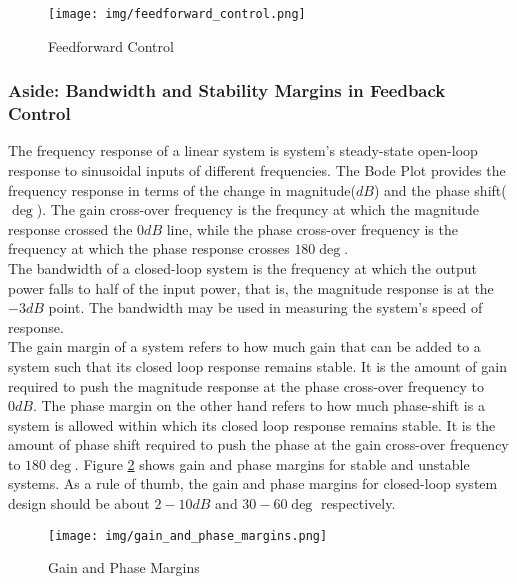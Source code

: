 \documentclass[a4paper]{article}
\begin{document}
\begin{figure}
        \centering
        \texttt{[image: img/feedforward\_control.png]}
        \caption{Feedforward Control \cite{kim17}}
        \label{fig:Cascaded}
\end{figure}


\subsubsection{Aside: Bandwidth and Stability Margins in Feedback Control}

The frequency response of a linear system is system's steady-state open-loop response to sinusoidal inputs of different frequencies. 
The Bode Plot provides the frequency response in terms of the change in magnitude($dB$) and the phase shift($\deg$). 
The gain cross-over frequency is the frequncy at which the magnitude response crossed the $0dB$ line, 
while the phase cross-over frequency is the frequency at which the phase response crosses $180\deg$.  \\

The bandwidth of a closed-loop system is the frequency at which the output power falls to half of the input power, 
that is, the magnitude response is at the $-3dB$ point. 
The bandwidth may be used in measuring the system's speed of response. 
\\
The gain margin of a system refers to how much gain that can be added to a system such that its closed loop response remains stable. 
It is the amount of gain required to push the magnitude response at the phase cross-over frequency to $0dB$.  
The phase margin on the other hand refers to how much phase-shift is a system is allowed within which its closed loop response remains stable. 
It is the amount of phase shift required to push the phase at the gain cross-over frequency to $180\deg$. 
Figure \ref{fig:gain_phase_margin} shows gain and phase margins for stable and unstable systems. 
As a rule of thumb, the gain and phase margins for closed-loop system design should be about $2-10dB$ and $30-60\deg$ respectively.  
\\
\begin{figure}
        \centering
        \texttt{[image: img/gain\_and\_phase\_margins.png]}
        \caption{Gain and Phase Margins \cite{kim17}}
        \label{fig:gain_phase_margin}
\end{figure}
\end{document}
